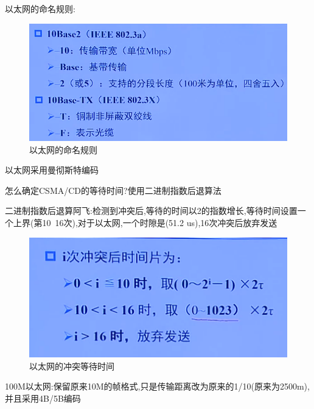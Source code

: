 \documentclass[UTF8,a4paper]{ctexart}
\begin{document}
以太网的命名规则:
\begin{figure}[H]
  \centering
  \includegraphics{assets/jisuanjiwangluo_d438c.png}
  \caption{以太网的命名规则}
\end{figure}

以太网采用曼彻斯特编码

怎么确定CSMA/CD的等待时间?使用二进制指数后退算法

二进制指数后退算阿飞:检测到冲突后,等待的时间以2的指数增长,等待时间设置一个上界(第10~16次),对于以太网,一个时隙是(51.2 us),16次冲突后放弃发送
\begin{figure}[H]
  \centering
  \includegraphics{assets/jisuanjiwangluo_408c6.png}
  \caption{以太网的冲突等待时间}
\end{figure}

100M以太网:保留原来10M的帧格式,只是传输距离改为原来的1/10(原来为2500m),并且采用4B/5B编码
\end{document}

